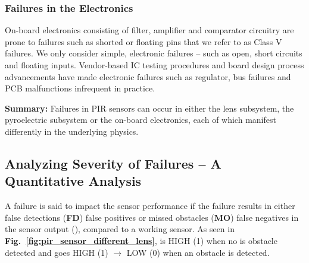 \subsubsection{\textbf{Failures in the Electronics}} On-board electronics consisting of filter, amplifier and comparator circuitry are prone to failures such as shorted or floating pins that we refer to as Class V failures. We only consider simple, electronic failures -- such as open, short circuits and floating inputs. Vendor-based IC testing procedures and board design process advancements have made electronic failures such as regulator, bus failures and PCB malfunctions infrequent in practice.



\noindent \textbf{Summary:} Failures in PIR sensors can occur in either the lens subsystem, the pyroelectric subsystem or the on-board electronics, each of which manifest differently in the underlying physics.


\subsection{Analyzing Severity of Failures -- A Quantitative Analysis}
\label{subsec:quantify}
A failure is said to impact the sensor performance if the failure results in either false detections ({\bfseries FD}) \ie false positives or missed obstacles ({\bfseries MO}) \ie false negatives in the sensor output (\cout), compared to a working sensor. As seen in {\bfseries Fig.~\ref{fig:pir_sensor_different_lens}}, \cout is HIGH (1) when no is obstacle detected and \cout goes HIGH (1) $\rightarrow$ LOW (0) when an obstacle is detected.

